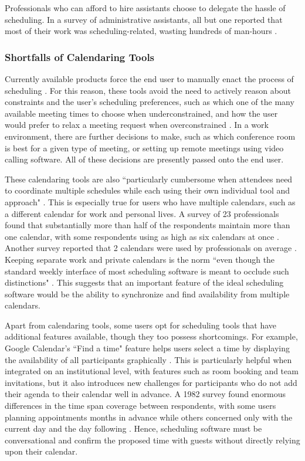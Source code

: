\documentclass{article}
\begin{document}
Professionals who can afford to hire assistants choose to delegate the hassle of scheduling. In a survey of administrative assistants, all but one reported that most of their work was scheduling-related, wasting hundreds of man-hours \cite{erickson_assistance:_2008}.

\subsubsection{Shortfalls of Calendaring Tools}

Currently available products force the end user to manually enact the process of scheduling \cite{jennings_agent-based_1995}. For this reason, these tools avoid the need to actively reason about constraints and the user's scheduling preferences, such as which one of the many available meeting times to choose when underconstrained, and how the user would prefer to relax a meeting request when overconstrained \cite{berry_ptime:_2011}. In a work environment, there are further decisions to make, such as which conference room is best for a given type of meeting, or setting up remote meetings using video calling software. All of these decisions are presently passed onto the end user.

These calendaring tools are also ``particularly cumbersome when attendees need to coordinate multiple schedules while each using their own individual tool and approach" \cite{cranshaw_calendar.help:_2017}. This is especially true for users who have multiple calendars, such as a different calendar for work and personal lives. A survey of 23 professionals found that substantially more than half of the respondents maintain more than one calendar, with some respondents using as high as six calendars at once \cite{kelley_how_1982}. Another survey reported that 2 calendars were used by professionals on average \cite{kincaid_electronic_1985}. Keeping separate work and private calendars is the norm ``even though the standard weekly interface of most scheduling software is meant to occlude such distinctions" \cite{wajcman_digital_2019}. This suggests that an important feature of the ideal scheduling software would be the ability to synchronize and find availability from multiple calendars.

Apart from calendaring tools, some users opt for scheduling tools that have additional features available, though they too possess shortcomings. For example, Google Calendar's ``Find a time" feature helps users select a time by displaying the availability of all participants graphically \cite{noauthor_google_2016}. This is particularly helpful when integrated on an institutional level, with features such as room booking and team invitations, but it also introduces new challenges for participants who do not add their agenda to their calendar well in advance. A 1982 survey found enormous differences in the time span coverage between respondents, with some users planning appointments months in advance while others concerned only with the current day and the day following \cite{kelley_how_1982}. Hence, scheduling software must be conversational and confirm the proposed time with guests without directly relying upon their calendar.
\end{document}
